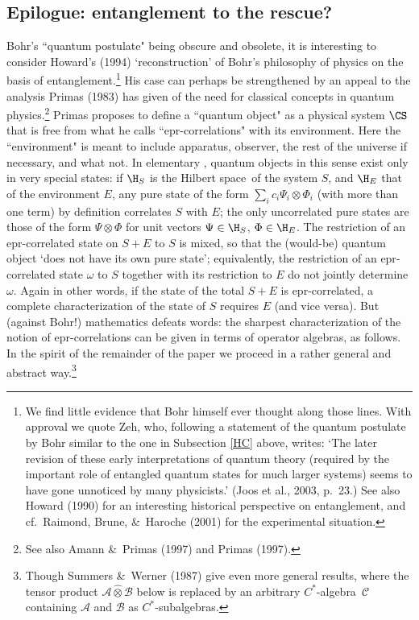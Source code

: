 \documentclass[12pt,titlepage]{article}
\newcommand{\epr}{{\sc epr}}
\newcommand{\ca}{$C^*$-algebra} \newcommand{\jba}{JB-algebra}
\newcommand{\Hs}{Hilbert space} \newcommand{\Bs}{Banach space}
\newcommand{\ot}{\otimes}
\newcommand{\om}{\omega} \newcommand{\Om}{\Omega}
\newcommand{\CA}{{\mathcal A}} \newcommand{\CB}{{\mathcal B}}
\newcommand{\CC}{{\mathcal C}} \newcommand{\CF}{{\mathcal F}}
\begin{document}
\subsection{Epilogue: entanglement to the rescue?}\label{primas}
Bohr's ``quantum postulate" being obscure and obsolete, it is interesting to consider Howard's (1994)  `reconstruction' of Bohr's philosophy of physics on the basis of entanglement.\footnote{We find little evidence that Bohr himself ever thought along those lines.  With approval we quote Zeh, who, following a statement of the quantum postulate by Bohr similar to the one in Subsection \ref{HC} above, writes: 
`The later revision of these early interpretations of quantum theory (required by the important role of entangled quantum states for much larger systems) seems to have gone unnoticed by many physicists.' (Joos et al., 2003, p.\ 23.) 
See also Howard (1990) for an interesting historical perspective on entanglement, and cf.\ 
Raimond, Brune,  \&\ Haroche (2001) for the experimental situation.
} His case can perhaps be strengthened by an appeal to the analysis Primas (1983) has given of the need for classical concepts in quantum physics.\footnote{See also Amann \&\ Primas (1997) and Primas (1997).}
Primas proposes to define a ``quantum object" as a physical system $\CS$ that  is free from what he calls ``\epr-correlations" with its environment. Here the ``environment" is meant to include apparatus, observer, the rest of the universe if necessary, and what not.  In elementary \qm,  quantum objects in this sense exist only in very special states: if $\H_S$ is the \Hs\ of the system $S$, and $\H_E$ that of the environment $E$, any pure state of the form
$\sum_i c_i \Psi_i\ot\Phi_i$ (with more than one term) by definition correlates $S$ with $E$; the only uncorrelated pure states are those of the form $\Psi\ot\Phi$ for unit vectors $\Psi\in \H_S$, $\Phi\in\H_E$.
The restriction of an \epr-correlated state on $S+E$ to $S$ is mixed, so that the (would-be) quantum object `does not have its own pure state'; equivalently, the restriction of an \epr-correlated state $\om$ to $S$ together with its restriction to $E$ do not jointly determine $\om$. Again in other words, if the state of the total $S+E$ is \epr-correlated, a complete characterization of the state of $S$ requires $E$ (and vice versa). But (against Bohr!) mathematics defeats words: the sharpest characterization of the notion of \epr-correlations can be given in terms of operator algebras, as follows.  
In the spirit of the remainder of the paper we proceed in a rather general and abstract way.\footnote{Though Summers \&\ Werner (1987) give even more general results, where the tensor product $\CA\hat{\ot}\CB$ below is replaced
by an arbitrary \ca\ $\CC$ containing $\CA$ and $\CB$ as $C^*$-subalgebras.
}
\end{document}
